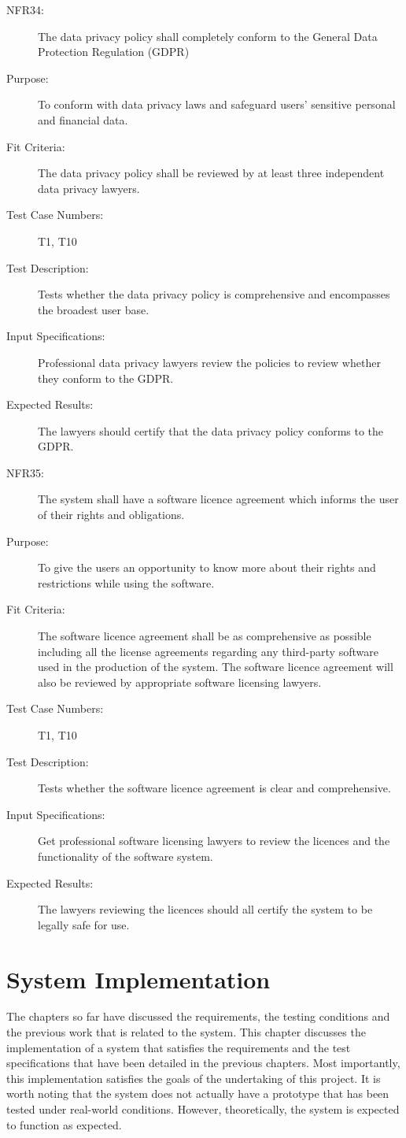 \documentclass[a4paper,twoside,phd]{BYUPhys}
\begin{document}
\begin{description}
\item[NFR34:] The data privacy policy shall completely conform to the General Data Protection Regulation (GDPR)
\item[Purpose:] To conform with data privacy laws and safeguard users' sensitive personal and financial data.
\item[Fit Criteria:] The data privacy policy shall be reviewed by at least three independent data privacy lawyers. 
\item[Test Case Numbers:] T1, T10
\item[Test Description:] Tests whether the data privacy policy is comprehensive and encompasses the broadest user base.
\item[Input Specifications:] Professional data privacy lawyers review the policies to review whether they conform to the GDPR.
\item[Expected Results:] The lawyers should certify that the data privacy policy conforms to the GDPR.

\item[NFR35:] The system shall have a software licence agreement which informs the user of their rights and obligations.
\item[Purpose:] To give the users an opportunity to know more about their rights and restrictions while using the software.
\item[Fit Criteria:] The software licence agreement shall be as comprehensive as possible including all the license agreements regarding any third-party software used in the production of the system. The software licence agreement will also be reviewed by appropriate software licensing lawyers.
\item[Test Case Numbers:] T1, T10
\item[Test Description:] Tests whether the software licence agreement is clear and comprehensive.
\item[Input Specifications:] Get professional software licensing lawyers to review the licences and the functionality of the software system.
\item[Expected Results:] The lawyers reviewing the licences should all certify the system to be legally safe for use.
\end{description}

\chapter{System Implementation}
\label{chap:System Implementation}
The chapters so far have discussed the requirements, the testing conditions and the previous work that is related to the system. This chapter discusses the implementation of a system that satisfies the requirements and the test specifications that have been detailed in the previous chapters. Most importantly, this implementation satisfies the goals of the undertaking of this project. It is worth noting that the system does not actually have a prototype that has been tested under real-world conditions. However, theoretically, the system is expected to function as expected.
\end{document}
